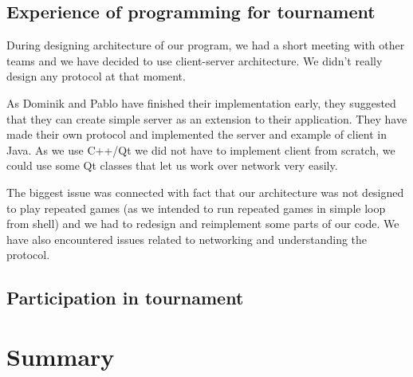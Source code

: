 \documentclass[paper=a4, fontsize=11pt]{article} %
\begin{document}
\subsection{Experience of programming for tournament}
During designing architecture of our program, we had a short  meeting with other teams and we have decided to use client-server architecture. 
We didn't really design any protocol at that moment.

As Dominik and Pablo have finished their implementation early, they suggested that they can create simple server as an extension to their application. 
They have made their own protocol and implemented the server and example of client in Java. 
As we use C++/Qt we did not have to implement client from scratch, we could use some Qt classes that let us work over network very easily. 

The biggest issue was connected with fact that our architecture was not designed to play repeated games (as we intended to run repeated games in simple loop from shell) and we had to redesign and reimplement some parts of our code. We have also encountered issues related to networking and understanding the protocol.

\subsection{Participation in tournament}
\section{Summary}

\begin{flushleft}
%
\end{flushleft}
\end{document}
